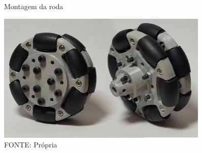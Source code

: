 \begin{figure}[h]
	\centering
	\caption{Montagem da roda}
	\label{wheel_assembling}
	\includegraphics[width=0.9\textwidth]{figures/roda_processo_desing_passo4}
    \caption*{FONTE: Própria}
\end{figure}